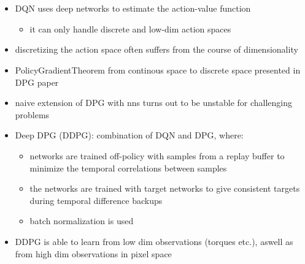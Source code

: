 \\
\\
\begin{itemize}
\item DQN uses deep networks to estimate the action-value function
\begin{itemize}
\item it can only handle discrete and low-dim action spaces
\end{itemize}
\item discretizing the action space often suffers from the course of dimensionality
\item PolicyGradientTheorem from continous space to discrete space presented in DPG paper
\item naive extension of DPG with nns turns out to be unstable for challenging problems
\item Deep DPG (DDPG): combination of DQN and DPG, where:
\begin{itemize}
\item networks are trained off-policy with samples from a replay buffer to minimize the temporal correlations between samples
\item the networks are trained with target networks to give consistent targets during temporal difference backups
\item batch normalization is used
\end{itemize}
\item DDPG is able to learn from low dim observations (torques etc.), aswell as from high dim observations in pixel space
\end{itemize}


